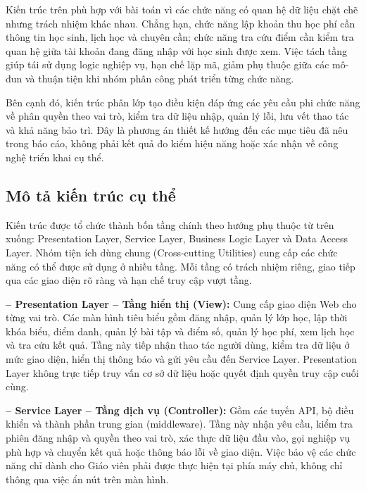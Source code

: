 Kiến trúc trên phù hợp với bài toán vì các chức năng có quan hệ dữ liệu chặt chẽ nhưng trách nhiệm khác nhau. Chẳng hạn, chức năng lập khoản thu học phí cần thông tin học sinh, lịch học và chuyên cần; chức năng tra cứu điểm cần kiểm tra quan hệ giữa tài khoản đang đăng nhập với học sinh được xem. Việc tách tầng giúp tái sử dụng logic nghiệp vụ, hạn chế lặp mã, giảm phụ thuộc giữa các mô-đun và thuận tiện khi nhóm phân công phát triển từng chức năng.\par

Bên cạnh đó, kiến trúc phân lớp tạo điều kiện đáp ứng các yêu cầu phi chức năng về phân quyền theo vai trò, kiểm tra dữ liệu nhập, quản lý lỗi, lưu vết thao tác và khả năng bảo trì. Đây là phương án thiết kế hướng đến các mục tiêu đã nêu trong báo cáo, không phải kết quả đo kiểm hiệu năng hoặc xác nhận về công nghệ triển khai cụ thể.\par

\subsection{Mô tả kiến trúc cụ thể}

Kiến trúc được tổ chức thành bốn tầng chính theo hướng phụ thuộc từ trên xuống: Presentation Layer, Service Layer, Business Logic Layer và Data Access Layer. Nhóm tiện ích dùng chung (Cross-cutting Utilities) cung cấp các chức năng có thể được sử dụng ở nhiều tầng. Mỗi tầng có trách nhiệm riêng, giao tiếp qua các giao diện rõ ràng và hạn chế truy cập vượt tầng.\par

\begin{samepage}
\noindent\hspace*{0.65em}\textbf{– Presentation Layer – Tầng hiển thị (View): }Cung cấp giao diện Web cho từng vai trò. Các màn hình tiêu biểu gồm đăng nhập, quản lý lớp học, lập thời khóa biểu, điểm danh, quản lý bài tập và điểm số, quản lý học phí, xem lịch học và tra cứu kết quả. Tầng này tiếp nhận thao tác người dùng, kiểm tra dữ liệu ở mức giao diện, hiển thị thông báo và gửi yêu cầu đến Service Layer. Presentation Layer không trực tiếp truy vấn cơ sở dữ liệu hoặc quyết định quyền truy cập cuối cùng.\par
\end{samepage}

\begin{samepage}
\noindent\hspace*{0.65em}\textbf{– Service Layer – Tầng dịch vụ (Controller): }Gồm các tuyến API, bộ điều khiển và thành phần trung gian (middleware). Tầng này nhận yêu cầu, kiểm tra phiên đăng nhập và quyền theo vai trò, xác thực dữ liệu đầu vào, gọi nghiệp vụ phù hợp và chuyển kết quả hoặc thông báo lỗi về giao diện. Việc bảo vệ các chức năng chỉ dành cho Giáo viên phải được thực hiện tại phía máy chủ, không chỉ thông qua việc ẩn nút trên màn hình.\par
\end{samepage}

